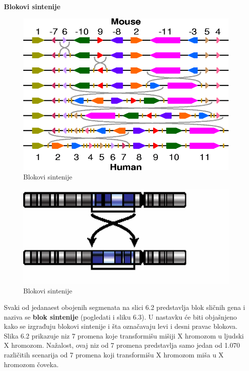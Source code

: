 \hspace{4cm}\large{\textbf{Blokovi sintenije}}\\

\begin{figure}[h!]
\centering
\includegraphics[scale=0.7]{poglavlja/6/slike/transformacija.png}
\caption{Blokovi sintenije}
\label{slika:X}
\end{figure}


\begin{figure}[h!]
\centering
\includegraphics[scale=0.7]{poglavlja/6/slike/transformacijaa.png}
\caption{Blokovi sintenije}
\label{slika:X}
\end{figure}

Svaki od jedanaest obojenih segmenata na slici 6.2 predstavlja blok sličnih gena i naziva se \textbf{blok sintenije} (pogledati i sliku 6.3). U nastavku će biti objašnjeno kako se izgrađuju blokovi sintenije i šta označavaju levi i desni pravac blokova.\\

Slika 6.2 prikazuje niz 7 promena koje transformišu mišiji X hromozom u ljudski X hromozom. Nažalost, ovaj niz od 7 promena predstavlja samo jedan od 1.070 različitih scenarija od 7 promena koji transformišu X hromozom miša u X hromozom čoveka.\\


